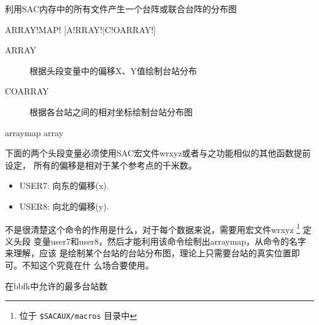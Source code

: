 \label{cmd:arraymap}

利用SAC内存中的所有文件产生一个台阵或联合台阵的分布图

\begin{SACSTX}
ARRAY!MAP! [A!RRAY!|C!OARRAY!]
\end{SACSTX}

\begin{description}
\item [ARRAY] 根据头段变量中的偏移X、Y值绘制台站分布
\item [COARRAY] 根据各台站之间的相对坐标绘制台站分布图
\end{description}

\begin{SACDFT}
arraymap array
\end{SACDFT}

下面的两个头段变量必须使用SAC宏文件wrxyz或者与之功能相似的其他函数提前设定，
所有的偏移是相对于某个参考点的千米数。
\begin{itemize}
\item USER7: 向东的偏移(x).
\item USER8: 向北的偏移(y).
\end{itemize}

不是很清楚这个命令的作用是什么，对于每个数据来说，需要用宏文件wrxyz
\footnote{位于 \verb|$SACAUX/macros| 目录中}
定义头段
变量user7和user8，然后才能利用该命令绘制出arraymap，从命令的名字来理解，应该
是绘制某个台站的台站分布图，理论上只需要台站的真实位置即可。不知这个究竟在什
么场合要使用。

在bbfk中允许的最多台站数
